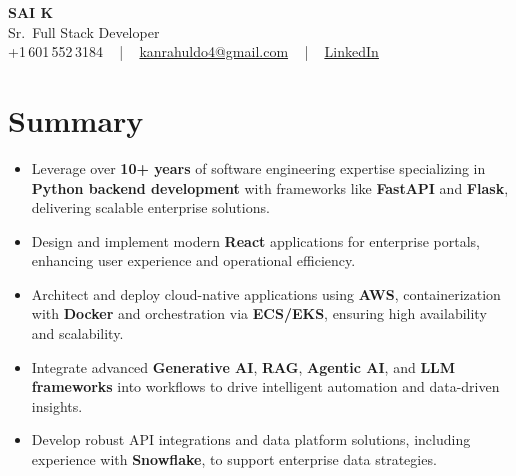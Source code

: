 \documentclass[letterpaper,11pt]{article}
\newcommand{\resumeItem}[1]{
  \item\footnotesize{
    {#1 \vspace{-2pt}}
  }
}
\newcommand{\resumeItemListStart}{\begin{itemize}[leftmargin=*]}
\newcommand{\resumeItemListEnd}{\end{itemize}\vspace{-5pt}}
\begin{document}
\begin{center}
    {\fontsize{14pt}{12pt}\selectfont \textbf{\MakeUppercase{Sai K}}}\\ \vspace{2pt}
    \fontsize{10pt}{12pt}\selectfont Sr.\ Full Stack Developer\\ \vspace{2pt}
    \fontsize{10pt}{12pt}\selectfont +1\,601\,552\,3184 ~ | ~
    \href{mailto:kanrahuldo4@gmail.com}{kanrahuldo4@gmail.com} ~ | ~
    \href{https://www.linkedin.com/in/srrrk/}{\color{blue}\underline{LinkedIn}}
    \vspace{-10pt}
\end{center}

\section{Summary}
\fontsize{9pt}{10pt}\selectfont
\resumeItemListStart
  \resumeItem{Leverage over \textbf{10+ years} of software engineering expertise specializing in \textbf{Python backend development} with frameworks like \textbf{FastAPI} and \textbf{Flask}, delivering scalable enterprise solutions.}
  \resumeItem{Design and implement modern \textbf{React} applications for enterprise portals, enhancing user experience and operational efficiency.}
  \resumeItem{Architect and deploy cloud-native applications using \textbf{AWS}, containerization with \textbf{Docker} and orchestration via \textbf{ECS/EKS}, ensuring high availability and scalability.}
  \resumeItem{Integrate advanced \textbf{Generative AI}, \textbf{RAG}, \textbf{Agentic AI}, and \textbf{LLM frameworks} into workflows to drive intelligent automation and data-driven insights.}
  \resumeItem{Develop robust API integrations and data platform solutions, including experience with \textbf{Snowflake}, to support enterprise data strategies.}
\resumeItemListEnd
\vspace{-6pt}

\end{document}
